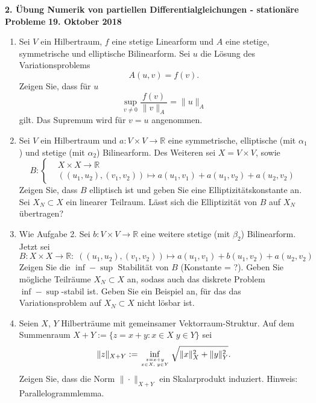 \documentclass[11pt,a4paper]{report}
\begin{document}
\begin{center}
\textbf{2. \"Ubung Numerik von partiellen Differentialgleichungen - station\"are Probleme} \newline 
\textbf{19. Oktober 2018}
\end{center}
\begin{enumerate}








\item Sei $V$ ein Hilbertraum, $f$ eine stetige Linearform und $A$ eine stetige, symmetrische und elliptische Bilinearform. Sei $u$ die L\"osung des Variationsproblems
$$A(u,v) = f(v).$$
Zeigen Sie, dass f\"ur $u$
$$\sup\limits_{v\neq 0} \frac{f(v)}{\|v\|_A} = \|u\|_A$$
gilt. Das Supremum wird f\"ur $v=u$ angenommen.
\vspace{15pt}


\item Sei $V$ ein Hilbertraum und $a: V \times V \rightarrow \mathbb{R}$ eine symmetrische, elliptische (mit $\alpha_1$) und stetige (mit $\alpha_2$) Bilinearform. Des Weiteren sei $X = V \times V$, sowie
$$
B: \left\{
\begin{aligned}
 & X \times X \rightarrow \mathbb{R} \\
 &((u_1,u_2),(v_1,v_2)) \mapsto a(u_1,v_1) + a(u_1,v_2) + a(u_2,v_2)
\end{aligned}
\right.
$$
Zeigen Sie, dass $B$ elliptisch ist und geben Sie eine Elliptizit\"atskonstante an.
Sei $X_N \subset X$ ein linearer Teilraum. L\"asst sich die Elliptizit\"at von $B$ auf $X_N$ \"ubertragen?
\vspace{15pt}


\item Wie Aufgabe 2. Sei $b: V \times V \rightarrow \mathbb{R}$ eine weitere stetige (mit $\beta_2$) Bilinearform. Jetzt sei
$$
B: X \times X \rightarrow \mathbb{R}:\;((u_1,u_2),(v_1,v_2)) \mapsto a(u_1,v_1) + b(u_1,v_2) + a(u_2,v_2)
$$
Zeigen Sie die $\inf-\sup$ Stabilit\"at von $B$ (Konstante = ?).
Geben Sie m\"ogliche Teilr\"aume $X_N\subset X$ an, sodass auch das
diskrete Problem $\inf-\sup$-stabil ist. Geben Sie ein Beispiel an,
f\"ur das das Variationsproblem auf $X_N \subset X$ nicht l\"osbar ist.
\vspace{15pt}


\item Seien $X$, $Y$ Hilbertr\"aume mit gemeinsamer Vektorraum-Struktur. Auf dem Summenraum $X+Y:= \{z = x+ y: x\in X\;y\in Y \}$ sei 
$$\| z\|_{X+Y}:= \inf\limits_{z=x+y \atop x\in X,\; y\in Y} \sqrt{\|x\|_X^2 +\|y\|_Y^2}.$$
Zeigen Sie, dass die Norm $\|\cdot \|_{X+Y}$ ein Skalarprodukt
induziert. Hinweis: Parallelogrammlemma.
\vspace{15pt}




\end{enumerate}
\end{document}

